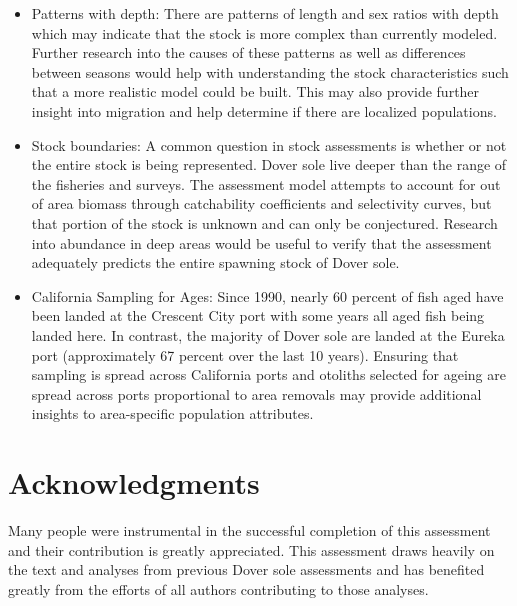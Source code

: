 \documentclass[11pt,
  english,
  a4paper,
]{article}
\begin{document}
\begin{itemize}

\item Patterns with depth:  There are patterns of length and sex ratios with depth which may indicate that the stock is more complex than currently modeled.  Further research into the causes of these patterns as well as differences between seasons would help with understanding the stock characteristics such that a more realistic model could be built.  This may also provide further insight into migration and help determine if there are localized populations.

\item Stock boundaries: A common question in stock assessments is whether or not the entire stock is being represented. Dover sole live deeper than the range of the fisheries and surveys.  The assessment model attempts to account for out of area biomass through catchability coefficients and selectivity curves, but that portion of the stock is unknown and can only be conjectured.  Research into abundance in deep areas would be useful to verify that the assessment adequately predicts the entire spawning stock of Dover sole.

\item California Sampling for Ages: Since 1990, nearly 60 percent of fish aged have been landed at the Crescent City port with some years all aged fish being landed here. In contrast, the majority of Dover sole are landed at the Eureka port (approximately 67 percent over the last 10 years). Ensuring that sampling is spread across California ports and otoliths selected for ageing are spread across ports proportional to area removals may provide additional insights to area-specific population attributes.

\end{itemize}


\hypertarget{acknowledgments}{%
\section{Acknowledgments}\label{acknowledgments}}

\leavevmode\tagmcend\tagstructend


Many people were instrumental in the successful completion of this assessment and their contribution is greatly appreciated. This assessment draws heavily on the text and analyses from previous Dover sole assessments and has benefited greatly from the efforts of all authors contributing to those analyses.
\end{document}
